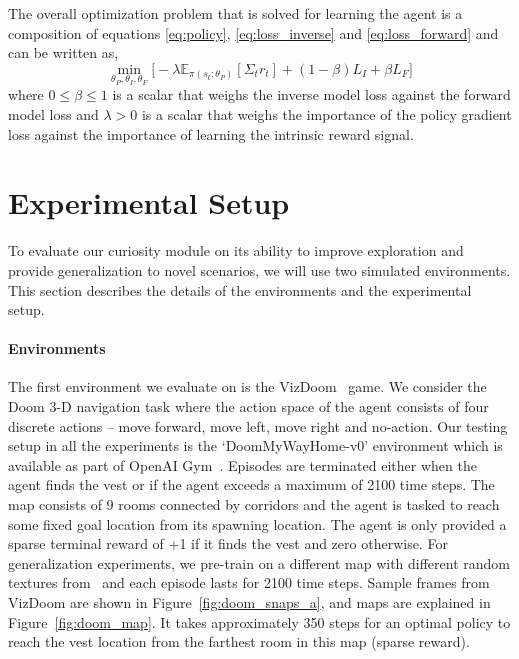 \documentclass{article}
\begin{document}
The overall optimization problem that is solved for learning the agent is a composition of equations \ref{eq:policy}, \ref{eq:loss_inverse} and \ref{eq:loss_forward} and can be written as,
\begin{equation}
   \min_{\theta_P, \theta_I, \theta_F}\Bigg[-\lambda \mathbb{E}_{\pi(s_t; \theta_P)}[\Sigma_t r_t] + (1 - \beta)L_I + \beta L_F \Bigg]
\end{equation}
where $0 \leq \beta \leq 1$ is a scalar that weighs the inverse model loss against the forward model loss and $\lambda > 0$ is a scalar that weighs the importance of the policy gradient loss against the importance of learning the intrinsic reward signal.

\section{Experimental Setup}
\label{sec:expsetup}
To evaluate our curiosity module on its ability to improve exploration and provide generalization to novel scenarios, we will use two simulated environments. This section describes the details of the environments and the experimental setup.

\paragraph{Environments}
The first environment we evaluate on is the VizDoom~\cite{doom} game. We consider the Doom 3-D navigation task where the action space of the agent consists of four discrete actions -- move forward, move left, move right and no-action.
Our testing setup in all the experiments is the `DoomMyWayHome-v0' environment which is available as part of OpenAI Gym~\cite{openaigym}.
Episodes are terminated either when the agent finds the vest or if the agent exceeds a maximum of 2100 time steps.
The map consists of $9$ rooms connected by corridors and the agent is tasked to reach some fixed goal location from its spawning location.
The agent is only provided a sparse terminal reward of +1 if it finds the vest and zero otherwise.
For generalization experiments, we pre-train on a different map with different random textures from~\cite{dosovitskiy2016learning} and each episode lasts for 2100 time steps.
Sample frames from VizDoom are shown in Figure~\ref{fig:doom_snaps_a}, and maps are explained in Figure~\ref{fig:doom_map}.
It takes approximately 350 steps for an optimal policy to reach the vest location from the farthest room in this map (sparse reward).
\end{document}
